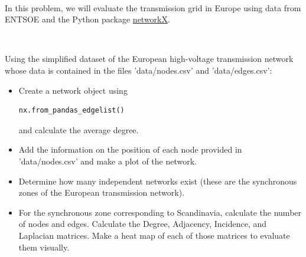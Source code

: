 \documentclass[10pt]{article}
\newenvironment{problem}[2][Problem]{\begin{trivlist}
\item[\hskip \labelsep {\bfseries #1}\hskip \labelsep {\bfseries #2.}]}{\end{trivlist}}
\begin{document}
\

\begin{problem}{3.4}

In this problem, we will evaluate the transmission grid in Europe using data from ENTSOE and the Python package \href{https://networkx.org/}{networkX}.

\

Using the simplified dataset of the European high-voltage transmission network whose data is contained in the files 'data/nodes.csv' and 'data/edges.csv':

\begin{itemize}
\item[a)] Create a network object using 
 
\begin{verbatim}
nx.from_pandas_edgelist()
\end{verbatim}

and calculate the average degree.

\item[b)]  Add the information on the position of each node provided in 'data/nodes.csv' and make a plot of the network.

\item[c)]  Determine how many independent networks exist (these are the synchronous zones of the European transmission network).

\item[d)]  For the synchronous zone corresponding to Scandinavia, calculate the number of nodes and edges. Calculate the Degree, Adjacency, Incidence, and Laplacian matrices. Make a heat map of each of those matrices to evaluate them visually.

\end{itemize}

\end{problem}

\end{document}

